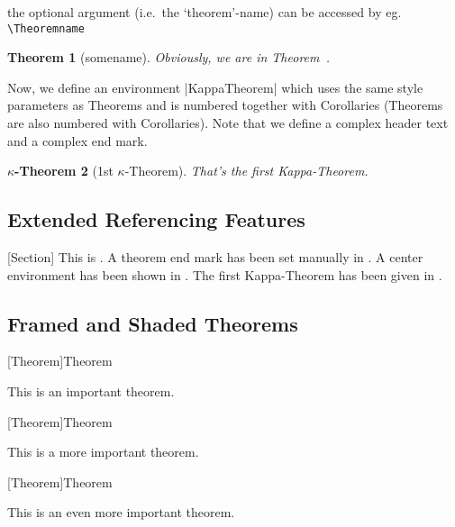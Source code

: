 \documentclass{article}
\theoremstyle{marginbreak}
\newtheorem{Theorem}{Theorem}
\theoremstyle{changebreak}
\theoremstyle{change}
\theoremstyle{plain}
\theoremstyle{nonumberplain}
\begin{document}
the optional argument (i.e.\ the `theorem'-name) can be accessed by
eg. \verb|\Theoremname|
\begin{Theorem}[somename]
Obviously, we are in Theorem~\Theoremname.
\end{Theorem}

Now, we define an environment |KappaTheorem| which uses the same 
style parameters as Theorems and is numbered together with
Corollaries (Theorems are also numbered with Corollaries).
Note that we define a complex header text and a complex end mark.
\newtheorem{KappaTheorem}[Theorem]{\(\kappa\)-Theorem}

\begin{KappaTheorem}[1st \(\kappa\)-Theorem]\label{kappatheorem1}
That's the first Kappa-Theorem. 
\end{KappaTheorem}



\subsection{Extended Referencing Features}\label{sec-ExtRef}[Section]
This is .
A theorem end mark has been set manually in .
A center environment has been shown in .
The first Kappa-Theorem has been given in .

\subsection{Framed and Shaded Theorems}

\theoremstyle{break}
[Theorem]{Theorem}
\begin{importantTheorem}
This is an important theorem.
\end{importantTheorem}

\def\theoremframecommand{\colorbox[rgb]{1,.9,.9}}
\theoremstyle{break}
[Theorem]{Theorem}
\begin{moreImportantTheorem}
This is a more important theorem.
\end{moreImportantTheorem}

\theoremstyle{break}
\theoreminframepreskip{0.5cm}
\theoreminframepostskip{1cm}
\theoremframepreskip{0cm}
\theoremframepostskip{0cm}
\def\theoremframecommand{\colorbox[rgb]{1,.5,.5}}
[Theorem]{Theorem}
\begin{evenMoreImportantTheorem}
This is an even more important theorem.
\end{evenMoreImportantTheorem}
\end{document}
